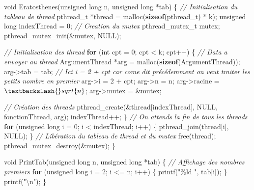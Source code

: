 \documentclass[
    ]{article}
\newenvironment{Shaded}{}{}
\newcommand{\CommentTok}[1]{\textcolor[rgb]{0.38,0.63,0.69}{\textit{#1}}}
\newcommand{\ControlFlowTok}[1]{\textcolor[rgb]{0.00,0.44,0.13}{\textbf{#1}}}
\newcommand{\DataTypeTok}[1]{\textcolor[rgb]{0.56,0.13,0.00}{#1}}
\newcommand{\DecValTok}[1]{\textcolor[rgb]{0.25,0.63,0.44}{#1}}
\newcommand{\KeywordTok}[1]{\textcolor[rgb]{0.00,0.44,0.13}{\textbf{#1}}}
\newcommand{\NormalTok}[1]{#1}
\newcommand{\SpecialCharTok}[1]{\textcolor[rgb]{0.25,0.44,0.63}{#1}}
\newcommand{\StringTok}[1]{\textcolor[rgb]{0.25,0.44,0.63}{#1}}
\begin{document}
\begin{Shaded}
    \begin{Highlighting}[]
\DataTypeTok{void}\NormalTok{ Eratosthenes(}\DataTypeTok{unsigned} \DataTypeTok{long}\NormalTok{ n, }\DataTypeTok{unsigned} \DataTypeTok{long}\NormalTok{ *tab)}
\NormalTok{\{}
\CommentTok{    // Initialisation du tableau de thread}
\NormalTok{    pthread\_t *thread = malloc(}\KeywordTok{sizeof}\NormalTok{(pthread\_t) * k);}
    \DataTypeTok{unsigned} \DataTypeTok{long}\NormalTok{ indexThread = }\DecValTok{0}\NormalTok{;}
    \CommentTok{// Creation du mutex}
\NormalTok{    pthread\_mutex\_t mutex;}
\NormalTok{    pthread\_mutex\_init(\&mutex, NULL);}

\CommentTok{    // Initialisation des thread }
    \ControlFlowTok{for}\NormalTok{ (}\DataTypeTok{int}\NormalTok{ cpt = }\DecValTok{0}\NormalTok{; cpt \textless{} k; cpt++)}
\NormalTok{    \{}
\CommentTok{    	// Data a envoyer au thread}
\NormalTok{        ArgumentThread *arg = malloc(}\KeywordTok{sizeof}\NormalTok{(ArgumentThread));}
\NormalTok{        arg{-}\textgreater{}tab = tab;}
\CommentTok{// Ici i = 2 + cpt car come dit précédemment on veut traiter les petits nombre en premier }
\NormalTok{        arg{-}\textgreater{}i = }\DecValTok{2}\NormalTok{ + cpt;}
\NormalTok{        arg{-}\textgreater{}n = n;}
\NormalTok{        arg{-}\textgreater{}racine = $\textbackslash{}sqrt\{n\}$;}
\NormalTok{        arg{-}\textgreater{}mutex = \&mutex;}
        
\CommentTok{        // Création des threads}
\NormalTok{        pthread\_create(\&thread[indexThread], NULL, fonctionThread, arg);}
\NormalTok{        indexThread++;}
\NormalTok{    \}}
\CommentTok{    // On attends la fin de tous les threads}
    \ControlFlowTok{for}\NormalTok{ (}\DataTypeTok{unsigned} \DataTypeTok{long}\NormalTok{ i = }\DecValTok{0}\NormalTok{; i \textless{} indexThread; i++)}
\NormalTok{    \{}
\NormalTok{        pthread\_join(thread[i], NULL);}
\NormalTok{    \}}
\CommentTok{    // Libération du tableau de thread et du mutex}
\NormalTok{    free(thread);}
\NormalTok{    pthread\_mutex\_destroy(\&mutex);}
\NormalTok{\}}

\DataTypeTok{void}\NormalTok{ PrintTab(}\DataTypeTok{unsigned} \DataTypeTok{long}\NormalTok{ n, }\DataTypeTok{unsigned} \DataTypeTok{long}\NormalTok{ *tab)}
\NormalTok{\{}
    \CommentTok{// Affichage des nombres premiers}
    \ControlFlowTok{for}\NormalTok{ (}\DataTypeTok{unsigned} \DataTypeTok{long}\NormalTok{ i = }\DecValTok{2}\NormalTok{; i \textless{}= n; i++)}
\NormalTok{    \{}
\NormalTok{        printf(}\StringTok{"\%ld "}\NormalTok{, tab[i]);}
\NormalTok{    \}}
\NormalTok{    printf(}\StringTok{"}\SpecialCharTok{\textbackslash{}n}\StringTok{"}\NormalTok{);}
\NormalTok{\}}


\end{Highlighting}
\end{Shaded}
\end{document}
